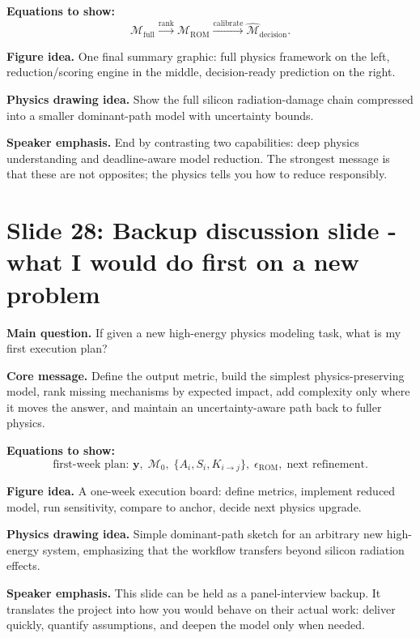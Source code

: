 \documentclass[11pt]{article}
\begin{document}
\textbf{Equations to show:}
\begin{equation*}
\boxed{\mathcal{M}_{\mathrm{full}}}
\xrightarrow{\text{rank}}
\boxed{\mathcal{M}_{\mathrm{ROM}}}
\xrightarrow{\text{calibrate}}
\boxed{\widehat{\mathcal{M}}_{\mathrm{decision}}}.
\end{equation*}

\textbf{Figure idea.} One final summary graphic: full physics framework on the left, reduction/scoring engine in the middle, decision-ready prediction on the right.

\textbf{Physics drawing idea.} Show the full silicon radiation-damage chain compressed into a smaller dominant-path model with uncertainty bounds.

\textbf{Speaker emphasis.} End by contrasting two capabilities: deep physics understanding and deadline-aware model reduction. The strongest message is that these are not opposites; the physics tells you how to reduce responsibly.

\section{Slide 28: Backup discussion slide - what I would do first on a new problem}
\begin{physicsbox}
\textbf{Main question.} If given a new high-energy physics modeling task, what is my first execution plan?
\end{physicsbox}

\textbf{Core message.} Define the output metric, build the simplest physics-preserving model, rank missing mechanisms by expected impact, add complexity only where it moves the answer, and maintain an uncertainty-aware path back to fuller physics.

\textbf{Equations to show:}
\begin{equation*}
\text{first-week plan: }
\mathbf{y},\; \mathcal{M}_0,\; \{A_i,S_i,K_{i\to j}\},\; \epsilon_{\mathrm{ROM}},\; \text{next refinement}.
\end{equation*}

\textbf{Figure idea.} A one-week execution board: define metrics, implement reduced model, run sensitivity, compare to anchor, decide next physics upgrade.

\textbf{Physics drawing idea.} Simple dominant-path sketch for an arbitrary new high-energy system, emphasizing that the workflow transfers beyond silicon radiation effects.

\textbf{Speaker emphasis.} This slide can be held as a panel-interview backup. It translates the project into how you would behave on their actual work: deliver quickly, quantify assumptions, and deepen the model only when needed.
\end{document}
